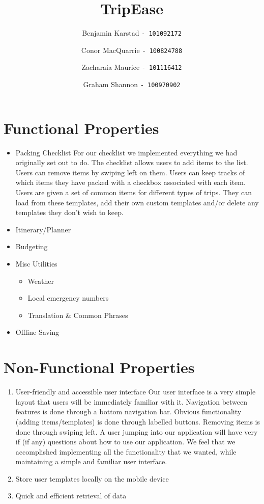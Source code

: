 \documentclass[12pt]{article}
\title{TripEase}
\author{
Benjamin Karstad
\texttt{- 101092172}
\and
Conor MacQuarrie
\texttt{- 100824788}
\and
Zacharaia Maurice
\texttt{- 101116412}
\and
Graham Shannon
\texttt{- 100970902}
}
\begin{document}
	\maketitle

	\section*{Functional Properties}

	\begin{itemize}

		\item{Packing Checklist}
		For our checklist we implemented everything we had originally set out to do.
		The checklist allows users to add items to the list. Users can remove items by swiping left on them.
		Users can keep tracks of which items they have packed with a checkbox associated with each item. Users are given a set of common items for different types of trips.
		They can load from these templates, add their own custom templates and/or delete any templates they don't wish to keep.

		\item{Itinerary/Planner}

		\item{Budgeting}

		\item{Misc Utilities}

		\begin{itemize}
			\item Weather
			\item Local emergency numbers
			\item Translation \& Common Phrases
		\end{itemize}

		\item{Offline Saving}

	\end{itemize}

	\section*{Non-Functional Properties}


	\begin{enumerate}
		\item{User-friendly and accessible user interface}
		Our user interface is a very simple layout that users will be immediately familiar with it. Navigation between features is done through a bottom navigation bar.
		Obvious functionality (adding items/templates) is done through labelled buttons. Removing items is done through swiping left.
		A user jumping into our application will have very if (if any) questions about how to use our application.
		We feel that we accomplished implementing all the functionality that we wanted, while maintaining a simple and familiar user interface.

		\item{Store user templates locally on the mobile device}

		\item{Quick and efficient retrieval of data}
	\end{enumerate}

	\pagebreak
\end{document}

